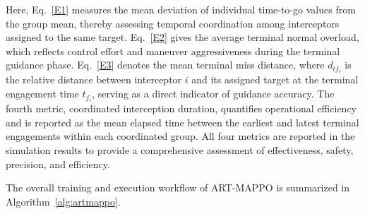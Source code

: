 \documentclass[lettersize,journal]{IEEEtran}
\begin{document}
Here, Eq.~\eqref{E1} measures the mean deviation of individual time-to-go values from the group mean, thereby assessing temporal coordination among interceptors assigned to the same target. Eq.~\eqref{E2} gives the average terminal normal overload, which reflects control effort and maneuver aggressiveness during the terminal guidance phase. Eq.~\eqref{E3} denotes the mean terminal miss distance, where $d_{tf_i}$ is the relative distance between interceptor $i$ and its assigned target at the terminal engagement time $t_{f_i}$, serving as a direct indicator of guidance accuracy. The fourth metric, coordinated interception duration, quantifies operational efficiency and is reported as the mean elapsed time between the earliest and latest terminal engagements within each coordinated group. All four metrics are reported in the simulation results to provide a comprehensive assessment of effectiveness, safety, precision, and efficiency.

The overall training and execution workflow of ART-MAPPO is summarized in
Algorithm~\ref{alg:artmappo}.
\end{document}
